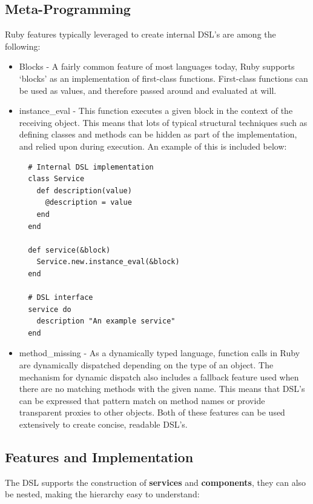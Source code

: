 \documentclass{cshonours}
\begin{document}
\subsection{Meta-Programming}

Ruby features typically leveraged to create internal DSL's are among the following:

\begin{itemize}
  \item{Blocks} - A fairly common feature of most languages today, Ruby supports `blocks' as an implementation of first-class functions. First-class functions can be used as values, and therefore passed around and evaluated at will.

  \item{instance\_eval} - This function executes a given block in the context of the receiving object. This means that lots of typical structural techniques such as defining classes and methods can be hidden as part of the implementation, and relied upon during execution. An example of this is included below:

  \begin{verbatim}
  # Internal DSL implementation
  class Service
    def description(value)
      @description = value
    end
  end

  def service(&block)
    Service.new.instance_eval(&block)
  end

  # DSL interface
  service do
    description "An example service"
  end
  \end{verbatim}
  \label{fig:MetaProgrammingSnippet}

  \item{method\_missing} - As a dynamically typed language, function calls in Ruby are dynamically dispatched depending on the type of an object. The mechanism for dynamic dispatch also includes a fallback feature used when there are no matching methods with the given name. This means that DSL's can be expressed that pattern match on method names or provide transparent proxies to other objects. Both of these features can be used extensively to create concise, readable DSL's.
\end{itemize}

\subsection{Features and Implementation}

The DSL supports the construction of \textbf{services} and \textbf{components}, they can also be nested, making the hierarchy easy to understand:
\end{document}
